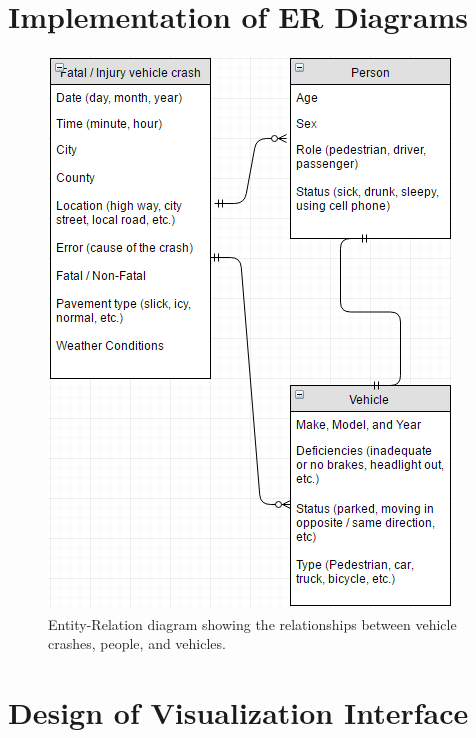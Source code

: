 \documentclass[journal]{vgtc}                %
\begin{document}
\section{Implementation of ER Diagrams}

\begin{figure}[er]
  \centering %
  \includegraphics[width=\columnwidth]{entityrelationship}
  \caption{Entity-Relation diagram showing the relationships between vehicle crashes, people, and vehicles.}
  \label{fig:sample}
\end{figure}

\section{Design of Visualization Interface}
\end{document}
